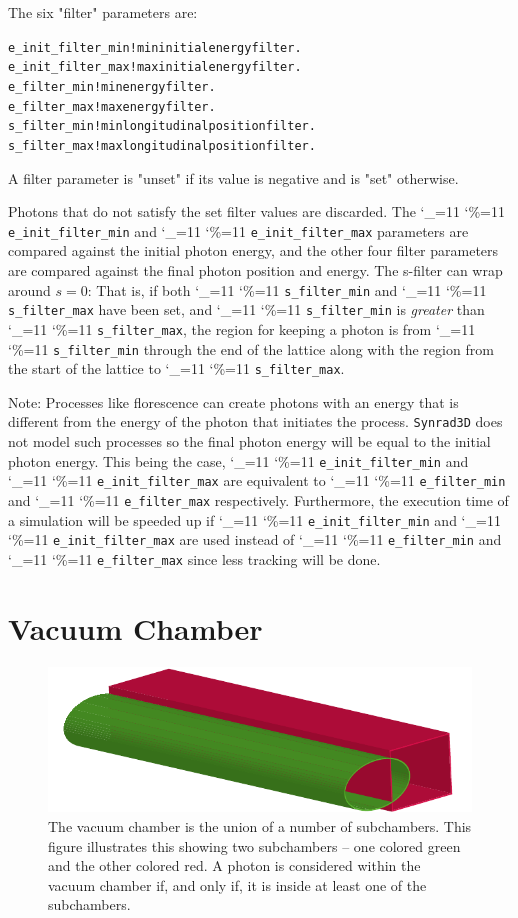 \documentclass[11pt,openany]{report}
\newcommand{\srthree}{\texttt{Synrad3D}\xspace}
\newcommand\ttcmd{\begingroup\catcode`\_=11 \catcode`\%=11 \dottcmd}
\newcommand\dottcmd[1]{\texttt{#1}\endgroup}
\newcommand{\vn}{\ttcmd}
\newlength{\ExBeg}
\newlength{\ExEnd}
\newenvironment{example}
  {\vspace{\ExBeg} \begin{alltt}}
  {\end{alltt} \vspace{\ExEnd}}
\begin{document}
The six "filter" parameters are:
\begin{example}
  e_init_filter_min   ! min initial energy filter.
  e_init_filter_max   ! max initial energy filter.
  e_filter_min        ! min energy filter.
  e_filter_max        ! max energy filter.
  s_filter_min        ! min longitudinal position filter.
  s_filter_max        ! max longitudinal position filter.
\end{example}
A filter parameter is "unset" if its value is negative and is "set"
otherwise.

Photons that do not satisfy the set filter values are discarded. The
\vn{e_init_filter_min} and \vn{e_init_filter_max} parameters are 
compared against the initial photon energy, and the other four
filter parameters are compared against the final photon position and
energy. The s-filter can wrap around $s = 0$: That is,
if both \vn{s_filter_min} and \vn{s_filter_max} have been set,
and \vn{s_filter_min} is {\em greater} than \vn{s_filter_max}, the region
for keeping a photon is from \vn{s_filter_min} through the end of the
lattice along with the region from the start of the lattice to
\vn{s_filter_max}.

Note: Processes like florescence can create photons with an energy that is different
from the energy of the photon that initiates the process. \srthree does not model such
processes so the final photon energy will be equal to the initial photon energy. This
being the case, \vn{e_init_filter_min} and \vn{e_init_filter_max} are equivalent to
\vn{e_filter_min} and \vn{e_filter_max} respectively. Furthermore, the execution time of a
simulation will be speeded up if \vn{e_init_filter_min} and \vn{e_init_filter_max} are
used instead of \vn{e_filter_min} and \vn{e_filter_max} since less tracking will be done.

\chapter{Vacuum Chamber} 
\label{s:vac.chamber}

\begin{figure}[bt]
\begin{center}
\includegraphics[width=5in]{vac-pipe.pdf} \caption[The vacuum chamber is the union of a
number of subchambers.]{The vacuum chamber is the union of a number of subchambers.
This figure illustrates this showing two subchambers -- one colored green and the other
colored red. A photon is considered within the vacuum chamber if, and only if, it is
inside at least one of the subchambers.}
\label{f:vac-chamber}
\end{center}
\end{figure}
\end{document}

